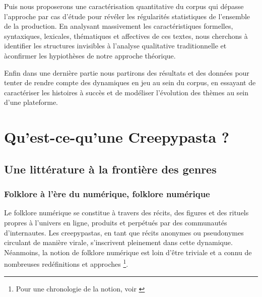 \documentclass[12pt,a4paper,oneside,titlepage]{book} %
\begin{document}
Puis nous proposerons une caractérisation quantitative du corpus qui dépasse l'approche par cas d'étude pour révéler les régularités statistiques de l'ensemble de la production. En analysant massivement les caractéristiques formelles, syntaxiques, lexicales, thématiques et affectives de ces textes, nous cherchons à identifier les structures invisibles à l'analyse qualitative traditionnelle et àconfirmer les hypiothèses de notre approche théorique.

Enfin dans une dernière partie nous partirons des résultats et des données pour tenter de rendre compte des dynamiques en jeu au sein du corpus, en essayant de caractériser les histoires à succès et de modéliser l'évolution des thèmes au sein d'une plateforme.

\pagebreak
\part{Qu'est-ce-qu'une Creepypasta ?}


\chapter{Une littérature à la frontière des genres}

\section{Folklore à l'ère du numérique, folklore numérique}

Le folklore numérique se constitue à travers des récits, des figures et des rituels propres à l’univers en ligne, produits et perpétués par des communautés d’internautes. Les creepypastas, en tant que récits anonymes ou pseudonymes circulant de manière virale, s’inscrivent pleinement dans cette dynamique. 
Néanmoins, la notion de folklore numérique est loin d'être triviale et a connu de nombreuses redéfinitions et approches \footnote{Pour une chronologie de la notion, voir \cite{de2020digital}}. 
\end{document}
